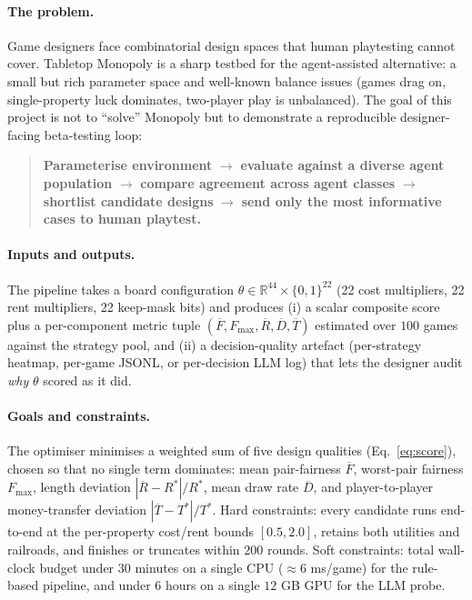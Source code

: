 \documentclass[10pt]{article}
\begin{document}
\paragraph{The problem.} Game designers face combinatorial design
spaces that human playtesting cannot cover. Tabletop Monopoly is a
sharp testbed for the agent-assisted alternative: a small but rich
parameter space and well-known balance issues (games drag on,
single-property luck dominates, two-player play is unbalanced). The
goal of this project is not to ``solve'' Monopoly but to demonstrate a
reproducible designer-facing beta-testing loop:
\begin{quote}
\textbf{Parameterise environment} $\to$ \textbf{evaluate against a
diverse agent population} $\to$ \textbf{compare agreement across
agent classes} $\to$ \textbf{shortlist candidate designs} $\to$
\textbf{send only the most informative cases to human playtest.}
\end{quote}

\paragraph{Inputs and outputs.} The pipeline takes a board configuration
$\theta \in \mathbb{R}^{44} \times \{0,1\}^{22}$ (22 cost multipliers,
22 rent multipliers, 22 keep-mask bits) and produces (i) a scalar
composite score plus a per-component metric tuple
$(\overline{F}, F_{\max}, \overline{R}, \overline{D}, \overline{T})$
estimated over $100$ games against the strategy pool, and (ii) a
decision-quality artefact (per-strategy heatmap, per-game JSONL, or
per-decision LLM log) that lets the designer audit \emph{why} $\theta$
scored as it did.

\paragraph{Goals and constraints.} The optimiser minimises a weighted
sum of five design qualities (Eq.~\ref{eq:score}), chosen so that no
single term dominates: mean pair-fairness $\overline{F}$, worst-pair
fairness $F_{\max}$, length deviation $|\overline{R}-R^{*}|/R^{*}$,
mean draw rate $\overline{D}$, and player-to-player money-transfer
deviation $|\overline{T}-T^{*}|/T^{*}$. Hard constraints: every
candidate runs end-to-end at the per-property cost/rent bounds
$[0.5, 2.0]$, retains both utilities and railroads, and finishes or
truncates within $200$ rounds. Soft constraints: total wall-clock
budget under $30$ minutes on a single CPU ($\approx 6$ ms/game) for the
rule-based pipeline, and under $6$ hours on a single $12$ GB GPU for
the LLM probe.
\end{document}
